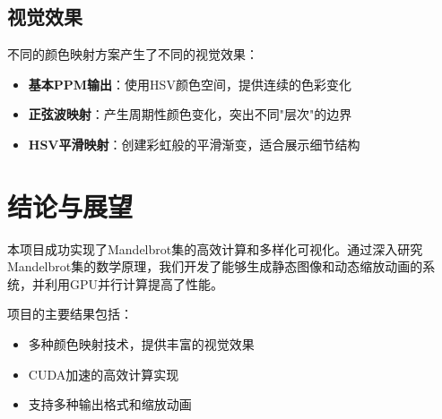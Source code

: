 \documentclass{article}
\begin{document}
\subsection{视觉效果}

不同的颜色映射方案产生了不同的视觉效果：

\begin{itemize}
    \item \textbf{基本PPM输出}：使用HSV颜色空间，提供连续的色彩变化
    \item \textbf{正弦波映射}：产生周期性颜色变化，突出不同"层次"的边界
    \item \textbf{HSV平滑映射}：创建彩虹般的平滑渐变，适合展示细节结构
\end{itemize}

\section{结论与展望}

本项目成功实现了Mandelbrot集的高效计算和多样化可视化。通过深入研究Mandelbrot集的数学原理，我们开发了能够生成静态图像和动态缩放动画的系统，并利用GPU并行计算提高了性能。

项目的主要结果包括：

\begin{itemize}
    \item 多种颜色映射技术，提供丰富的视觉效果
    \item CUDA加速的高效计算实现
    \item 支持多种输出格式和缩放动画
\end{itemize}
\end{document}
